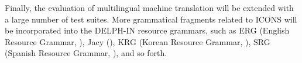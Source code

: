 

Finally, the evaluation of multilingual machine translation will be
extended with a large number of test suites. More grammatical
fragments related to ICONS will be incorporated into the
DELPH-IN resource grammars, such as ERG (English Resource Grammar,
\citealt{flickinger:00}), Jacy (\citealt{siegel:etal:16}), KRG
(Korean Resource Grammar, \citealt{kim:etal:11}), SRG (Spanish
Resource Grammar, \citealt{marimon:12}), and so forth.




